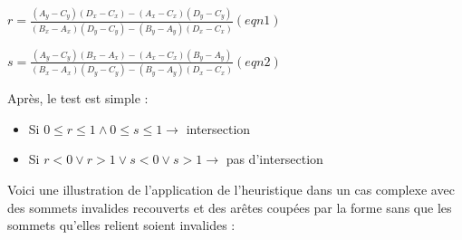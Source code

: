 \documentclass[a4paper,12pt]{report}
\begin{document}
$r = \frac{(A_{y}-C_{y})(D_{x}-C_{x})-(A_{x}-C_{x})(D_{y}-C_{y})}{(B_{x}-A_{x})(D_{y}-C_{y})-(B_{y}-A_{y})(D_{x}-C_{x})} (eqn 1)$

$s = \frac{(A_{y}-C_{y})(B_{x}-A_{x})-(A_{x}-C_{x})(B_{y}-A_{y})}{(B_{x}-A_{x})(D_{y}-C_{y})-(B_{y}-A_{y})(D_{x}-C_{x})} (eqn 2)$

Après, le test est simple : 
\begin{itemize}
 \item Si $0\le r \le 1 \wedge 0 \le s \le 1 \rightarrow$ intersection
 \item Si $r<0 \vee r>1 \vee s<0 \vee s>1 \rightarrow$ pas d'intersection
\end{itemize}



Voici une illustration de l'application de l'heuristique dans un cas complexe avec des sommets invalides recouverts et des arêtes coupées par la forme sans que les sommets qu'elles relient soient invalides : 
\end{document}
